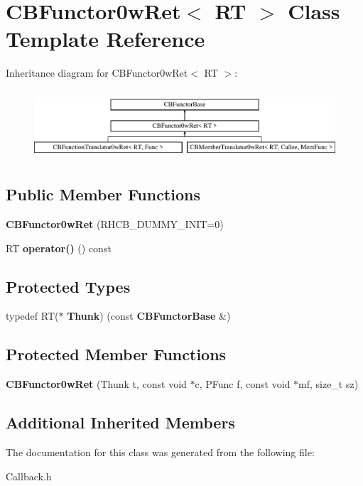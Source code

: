 \section{C\+B\+Functor0w\+Ret$<$ RT $>$ Class Template Reference}
\label{classCBFunctor0wRet}
Inheritance diagram for C\+B\+Functor0w\+Ret$<$ RT $>$\+:\begin{figure}[H]
\begin{center}
\leavevmode
\includegraphics[height=2.600619cm]{classCBFunctor0wRet}
\end{center}
\end{figure}
\subsection*{Public Member Functions}
\begin{DoxyCompactItemize}
\item 
{\bfseries C\+B\+Functor0w\+Ret} (R\+H\+C\+B\+\_\+\+D\+U\+M\+M\+Y\+\_\+\+I\+N\+IT=0)\label{classCBFunctor0wRet_a3011430b893c45ff3ab2fa57914c5ab7}

\item 
RT {\bfseries operator()} () const \label{classCBFunctor0wRet_af1ef6bed1d39de94804f28ed204a1fb4}

\end{DoxyCompactItemize}
\subsection*{Protected Types}
\begin{DoxyCompactItemize}
\item 
typedef RT($\ast$ {\bfseries Thunk}) (const {\bf C\+B\+Functor\+Base} \&)\label{classCBFunctor0wRet_ac692081fb628516cfe434239ee222721}

\end{DoxyCompactItemize}
\subsection*{Protected Member Functions}
\begin{DoxyCompactItemize}
\item 
{\bfseries C\+B\+Functor0w\+Ret} (Thunk t, const void $\ast$c, P\+Func f, const void $\ast$mf, size\+\_\+t sz)\label{classCBFunctor0wRet_a033b2bd9af030ea5e54f35f0e1557459}

\end{DoxyCompactItemize}
\subsection*{Additional Inherited Members}


The documentation for this class was generated from the following file\+:\begin{DoxyCompactItemize}
\item 
Callback.\+h\end{DoxyCompactItemize}
